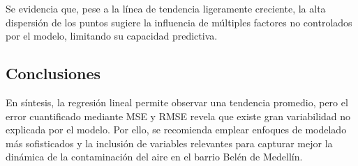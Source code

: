 \documentclass[a4paper,12pt]{article} %
\begin{document}
Se evidencia que, pese a la línea de tendencia ligeramente creciente, la alta dispersión de los puntos sugiere la influencia de múltiples factores no controlados por el modelo, limitando su capacidad predictiva.

\subsection{Conclusiones}

En síntesis, la regresión lineal permite observar una tendencia promedio, pero el error cuantificado mediante MSE y RMSE revela que existe gran variabilidad no explicada por el modelo. Por ello, se recomienda emplear enfoques de modelado más sofisticados y la inclusión de variables relevantes para capturar mejor la dinámica de la contaminación del aire en el barrio Belén de Medellín.
\end{document}
